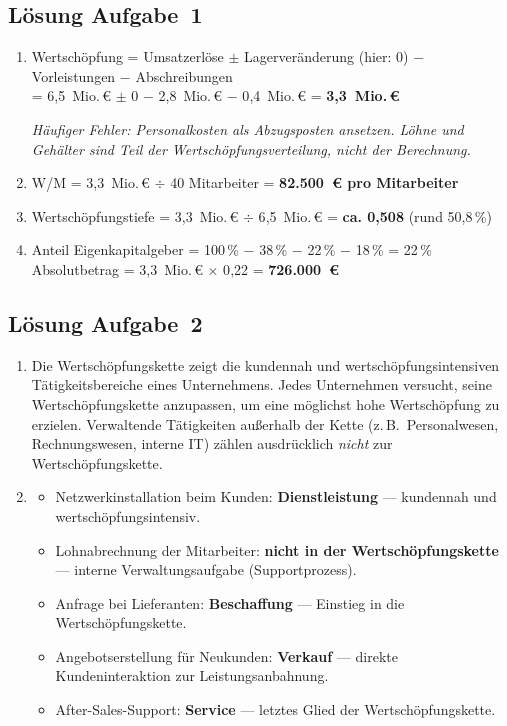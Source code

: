 \documentclass[11pt, a4paper]{article}
\begin{document}
\subsection*{Lösung Aufgabe~1}

\begin{enumerate}[label=(\alph*)]
  \item Wertschöpfung = Umsatzerlöse $\pm$ Lagerveränderung (hier: 0) $-$ Vorleistungen $-$ Abschreibungen\\
  = 6{,}5~Mio.\,€ $\pm$ 0 $-$ 2{,}8~Mio.\,€ $-$ 0{,}4~Mio.\,€ = \textbf{3{,}3~Mio.\,€}

  \textit{Häufiger Fehler: Personalkosten als Abzugsposten ansetzen. Löhne und Gehälter sind
  Teil der Wertschöpfungsverteilung, nicht der Berechnung.}

  \item W/M = 3{,}3~Mio.\,€ $\div$ 40 Mitarbeiter = \textbf{82.500~€ pro Mitarbeiter}

  \item Wertschöpfungstiefe = 3{,}3~Mio.\,€ $\div$ 6{,}5~Mio.\,€ = \textbf{ca. 0{,}508} (rund 50{,}8\,\%)

  \item Anteil Eigenkapitalgeber = 100\,\% $-$ 38\,\% $-$ 22\,\% $-$ 18\,\% = 22\,\%\\
  Absolutbetrag = 3{,}3~Mio.\,€ × 0{,}22 = \textbf{726.000~€}
\end{enumerate}

\subsection*{Lösung Aufgabe~2}

\begin{enumerate}[label=(\alph*)]
  \item Die Wertschöpfungskette zeigt die kundennah und wertschöpfungsintensiven
  Tätigkeitsbereiche eines Unternehmens. Jedes Unternehmen versucht, seine
  Wertschöpfungskette anzupassen, um eine möglichst hohe Wertschöpfung zu erzielen.
  Verwaltende Tätigkeiten außerhalb der Kette (z.\,B.\ Personalwesen, Rechnungswesen,
  interne IT) zählen ausdrücklich \emph{nicht} zur Wertschöpfungskette.

  \item
  \begin{itemize}
    \item Netzwerkinstallation beim Kunden: \textbf{Dienstleistung} --- kundennah und
    wertschöpfungsintensiv.
    \item Lohnabrechnung der Mitarbeiter: \textbf{nicht in der Wertschöpfungskette} ---
    interne Verwaltungsaufgabe (Supportprozess).
    \item Anfrage bei Lieferanten: \textbf{Beschaffung} --- Einstieg in die Wertschöpfungskette.
    \item Angebotserstellung für Neukunden: \textbf{Verkauf} --- direkte Kundeninteraktion
    zur Leistungsanbahnung.
    \item After-Sales-Support: \textbf{Service} --- letztes Glied der Wertschöpfungskette.
  \end{itemize}
\end{enumerate}
\end{document}
